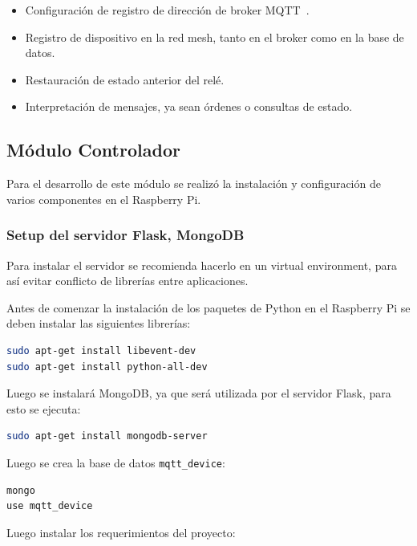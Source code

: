 \begin{itemize}
  \item Configuración de registro de dirección de broker MQTT~.
  \item Registro de dispositivo en la red mesh, tanto en el broker como en la base de datos.~
  \item Restauración de estado anterior del relé.
  \item Interpretación de mensajes, ya sean órdenes o consultas de estado.
\end{itemize}


\subsection{Módulo Controlador}

Para el desarrollo de este módulo se realizó la instalación y configuración de varios componentes en el Raspberry Pi.

\subsubsection{Setup del servidor Flask, MongoDB} \label{flask-mongo-conf}

Para instalar el servidor se recomienda hacerlo en un virtual environment, para así evitar conflicto de librerías entre aplicaciones.

Antes de comenzar la instalación de los paquetes de Python en el Raspberry Pi se deben instalar las siguientes librerías:

\begin{lstlisting}[language=bash]
sudo apt-get install libevent-dev
sudo apt-get install python-all-dev
\end{lstlisting}

Luego se instalará MongoDB, ya que será utilizada por el servidor Flask, para esto se ejecuta:

\begin{lstlisting}[language=bash]
sudo apt-get install mongodb-server
\end{lstlisting}

Luego se crea la base de datos \lstinline[columns=fixed]{mqtt_device}:

\begin{lstlisting}[language=bash]
mongo
use mqtt_device
\end{lstlisting}

Luego instalar los requerimientos del proyecto:

